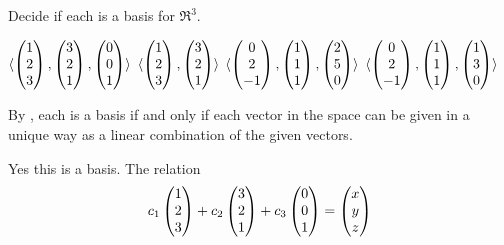 \begin{exercises}
  \recommended \item 
    Decide if each is a basis for \( \Re^3 \).
    \begin{exparts*}
      \partsitem \( \langle
                 \begin{pmatrix} 1 \\ 2 \\ 3 \end{pmatrix},
                 \begin{pmatrix} 3 \\ 2 \\ 1 \end{pmatrix},
                 \begin{pmatrix} 0 \\ 0 \\ 1 \end{pmatrix}\rangle  \)
      \partsitem \( \langle
                 \begin{pmatrix} 1 \\ 2 \\ 3 \end{pmatrix},
                 \begin{pmatrix} 3 \\ 2 \\ 1 \end{pmatrix}\rangle  \)
      \partsitem \( \langle
                 \begin{pmatrix} 0 \\ 2 \\ -1 \end{pmatrix},
                 \begin{pmatrix} 1 \\ 1 \\ 1 \end{pmatrix},
                 \begin{pmatrix} 2 \\ 5 \\ 0 \end{pmatrix}\rangle  \)
      \partsitem \( \langle
                 \begin{pmatrix} 0 \\ 2 \\ -1 \end{pmatrix},
                 \begin{pmatrix} 1 \\ 1 \\ 1 \end{pmatrix},
                 \begin{pmatrix} 1 \\ 3 \\ 0 \end{pmatrix}\rangle  \)
    \end{exparts*}
    \begin{answer}
      By , each is a basis if and only
      if each vector in the space can be given in a unique way as a linear
      combination of the given vectors.
      \begin{exparts}
        \partsitem Yes this is a basis.
          The relation
          \begin{equation*}
            c_1\colvec{1 \\ 2 \\ 3}
            +c_2\colvec{3 \\ 2 \\ 1}
            +c_3\colvec{0 \\ 0 \\ 1}
            =\colvec{x \\ y \\ z}

\end{equation*}
\end{exparts}
\end{answer}
\end{exercises}
